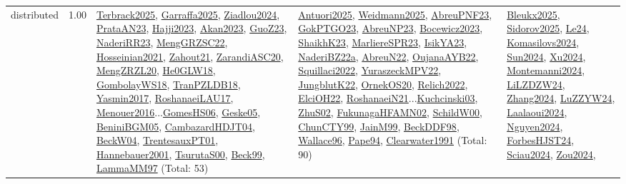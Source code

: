 {\begin{longtable}{p{3cm}r>{\raggedright\arraybackslash}p{6cm}>{\raggedright\arraybackslash}p{6cm}>{\raggedright\arraybackslash}p{8cm}}
\index{distributed}\index{Concepts!distributed}distributed &  1.00 & \hyperref[detail:Terbrack2025]{Terbrack2025}, \hyperref[detail:Garraffa2025]{Garraffa2025}, \hyperref[detail:Ziadlou2024]{Ziadlou2024}, \hyperref[detail:PrataAN23]{PrataAN23}, \hyperref[detail:Hajji2023]{Hajji2023}, \hyperref[detail:Akan2023]{Akan2023}, \hyperref[detail:GuoZ23]{GuoZ23}, \hyperref[detail:NaderiRR23]{NaderiRR23}, \hyperref[detail:MengGRZSC22]{MengGRZSC22}, \hyperref[detail:Hosseinian2021]{Hosseinian2021}, \hyperref[detail:Zahout21]{Zahout21}, \hyperref[detail:ZarandiASC20]{ZarandiASC20}, \hyperref[detail:MengZRZL20]{MengZRZL20}, \hyperref[detail:He0GLW18]{He0GLW18}, \hyperref[detail:GombolayWS18]{GombolayWS18}, \hyperref[detail:TranPZLDB18]{TranPZLDB18}, \hyperref[detail:Yasmin2017]{Yasmin2017}, \hyperref[detail:RoshanaeiLAU17]{RoshanaeiLAU17}, \hyperref[detail:Menouer2016]{Menouer2016}...\hyperref[detail:GomesHS06]{GomesHS06}, \hyperref[detail:Geske05]{Geske05}, \hyperref[detail:BeniniBGM05]{BeniniBGM05}, \hyperref[detail:CambazardHDJT04]{CambazardHDJT04}, \hyperref[detail:BeckW04]{BeckW04}, \hyperref[detail:TrentesauxPT01]{TrentesauxPT01}, \hyperref[detail:Hannebauer2001]{Hannebauer2001}, \hyperref[detail:TsurutaS00]{TsurutaS00}, \hyperref[detail:Beck99]{Beck99}, \hyperref[detail:LammaMM97]{LammaMM97} (Total: 53) & \hyperref[detail:Antuori2025]{Antuori2025}, \hyperref[detail:Weidmann2025]{Weidmann2025}, \hyperref[detail:AbreuPNF23]{AbreuPNF23}, \hyperref[detail:GokPTGO23]{GokPTGO23}, \hyperref[detail:AbreuNP23]{AbreuNP23}, \hyperref[detail:Bocewicz2023]{Bocewicz2023}, \hyperref[detail:ShaikhK23]{ShaikhK23}, \hyperref[detail:MarliereSPR23]{MarliereSPR23}, \hyperref[detail:IsikYA23]{IsikYA23}, \hyperref[detail:NaderiBZ22a]{NaderiBZ22a}, \hyperref[detail:AbreuN22]{AbreuN22}, \hyperref[detail:OujanaAYB22]{OujanaAYB22}, \hyperref[detail:Squillaci2022]{Squillaci2022}, \hyperref[detail:YuraszeckMPV22]{YuraszeckMPV22}, \hyperref[detail:JungblutK22]{JungblutK22}, \hyperref[detail:OrnekOS20]{OrnekOS20}, \hyperref[detail:Relich2022]{Relich2022}, \hyperref[detail:ElciOH22]{ElciOH22}, \hyperref[detail:RoshanaeiN21]{RoshanaeiN21}...\hyperref[detail:Kuchcinski03]{Kuchcinski03}, \hyperref[detail:ZhuS02]{ZhuS02}, \hyperref[detail:FukunagaHFAMN02]{FukunagaHFAMN02}, \hyperref[detail:SchildW00]{SchildW00}, \hyperref[detail:ChunCTY99]{ChunCTY99}, \hyperref[detail:JainM99]{JainM99}, \hyperref[detail:BeckDDF98]{BeckDDF98}, \hyperref[detail:Wallace96]{Wallace96}, \hyperref[detail:Pape94]{Pape94}, \hyperref[detail:Clearwater1991]{Clearwater1991} (Total: 90) & \hyperref[detail:Bleukx2025]{Bleukx2025}, \hyperref[detail:Sidorov2025]{Sidorov2025}, \hyperref[detail:Le24]{Le24}, \hyperref[detail:Komasilovs2024]{Komasilovs2024}, \hyperref[detail:Sun2024]{Sun2024}, \hyperref[detail:Xu2024]{Xu2024}, \hyperref[detail:Montemanni2024]{Montemanni2024}, \hyperref[detail:LiLZDZW24]{LiLZDZW24}, \hyperref[detail:Zhang2024]{Zhang2024}, \hyperref[detail:LuZZYW24]{LuZZYW24}, \hyperref[detail:Laalaoui2024]{Laalaoui2024}, \hyperref[detail:Nguyen2024]{Nguyen2024}, \hyperref[detail:ForbesHJST24]{ForbesHJST24}, \hyperref[detail:Sciau2024]{Sciau2024}, \hyperref[detail:Zou2024]{Zou2024}, 
\end{longtable}}
